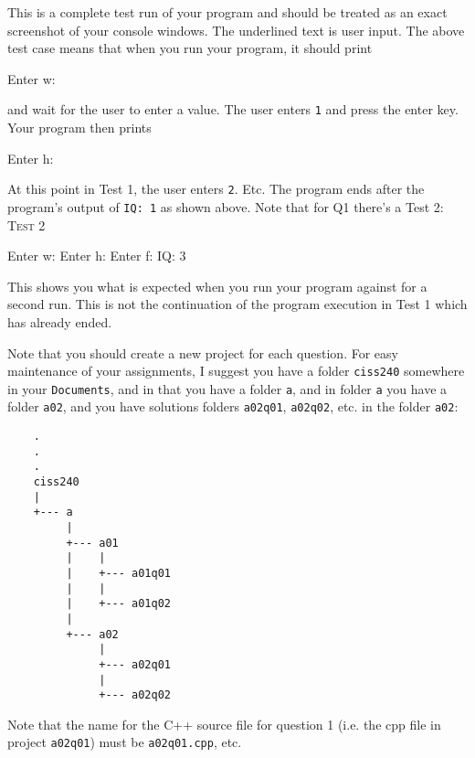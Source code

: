 This is a complete test run of your program and should be treated as an exact
screenshot of your console windows.
The underlined text is user input. 
The above test case means that when you run your program, it should print
\begin{console} 
Enter w: 
\end{console}
and wait for the user to enter a value. 
The user enters \verb!1! and press the enter key. 
Your program then prints
\begin{console}
Enter h: 
\end{console}
At this point in Test 1, the user enters \verb!2!. Etc.  
The program ends after the program's output of \verb!IQ: 1! as shown above.
Note that for Q1 there's a Test 2:
\textsc{Test 2}
\begin{console}[commandchars=\\\{\}]
Enter w: 
Enter h: 
Enter f: 
IQ: 3
\end{console}
This shows you what is expected when you run your program against
for a second run.
This is not the continuation of the program execution
in Test 1 which has already ended.

Note that you should create a new project for each question. 
For easy maintenance of your assignments, 
I suggest you have a folder \verb!ciss240! somewhere in your 
\verb!Documents!, and in that you have a folder \verb!a!, 
and in folder \verb!a! you have a folder \verb!a02!, 
and you have solutions folders \verb!a02q01!, \verb!a02q02!, etc. in the 
folder \verb!a02!:

\begin{Verbatim}
    .
    .
    .
    ciss240
    |
    +--- a
         |
         +--- a01
         |    |
         |    +--- a01q01
         |    |
         |    +--- a01q02
         |
         +--- a02
              |
              +--- a02q01
              |
              +--- a02q02
\end{Verbatim}

Note that the name for the C++ source file for question 1 
(i.e. the cpp file in 
project \verb!a02q01!) must be \verb!a02q01.cpp!, etc.




